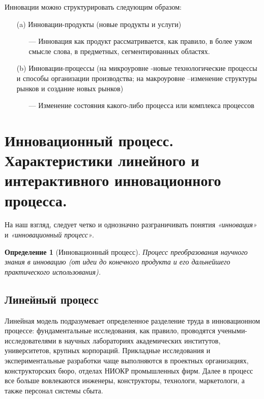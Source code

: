 \documentclass[11pt]{article}
\theoremstyle{plain} %
\newtheorem{proposition}[theorem]{Определение}
\theoremstyle{definition} %
\theoremstyle{remark} %
\begin{document}
Инновации  можно  структурировать следующим образом:
\begin{itemize}
	\item[(a)] Инновации-продукты (новые продукты и услуги)
	\begin{itemize}
		\item[---] Инновация  как  продукт рассматривается,  как  правило,  в  более  узком  смысле  слова,  в  предметных, сегментированных  областях.
	\end{itemize}
	\item[(b)] Инновации-процессы (на  микроуровне -новые  технологические процессы  и  способы  организации  производства;  на  макроуровне –изменение структуры рынков и создание новых рынков)
	\begin{itemize}
		\item[---] Изменение    состояния какого-либо  процесса  или  комплекса процессов
	\end{itemize}
\end{itemize}

\newpage


\section{Инновационный процесс. Характеристики линейного и интерактивного инновационного процесса.}\label{erste}

На  наш  взгляд,  следует четко и однозначно разграничивать понятия \textit{«инновация»} и \textit{«инновационный процесс»}.

\begin{proposition}[Инновационный процесс]
	Процесс преобразования научного знания в инновацию (от идеи до конечного продукта  и его дальнейшего практического использования).
\end{proposition}



\subsection{Линейный процесс}

Линейная модель подразумевает определенное разделение труда в инновационном процессе: фундаментальные исследования, как правило, проводятся учеными-исследователями в научных лабораториях академических институтов, университетов, крупных корпораций. Прикладные исследования и экспериментальные разработки чаще выполняются в проектных организациях, конструкторских бюро, отделах НИОКР промышленных фирм. Далее в процесс все больше вовлекаются инженеры, конструкторы, технологи, маркетологи, а также персонал системы сбыта.
\end{document}
